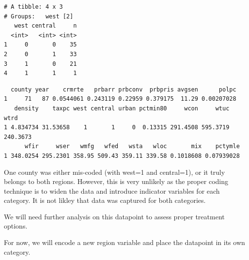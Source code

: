 \documentclass[]{article}
\newenvironment{Shaded}{}{}
\newcommand{\DecValTok}[1]{#1}
\newcommand{\KeywordTok}[1]{\textcolor[rgb]{0.00,0.00,1.00}{#1}}
\newcommand{\NormalTok}[1]{#1}
\newcommand{\OperatorTok}[1]{#1}
\newcommand{\StringTok}[1]{\textcolor[rgb]{0.00,0.50,0.50}{#1}}
\begin{document}
\begin{verbatim}
# A tibble: 4 x 3
# Groups:   west [2]
   west central     n
  <int>   <int> <int>
1     0       0    35
2     0       1    33
3     1       0    21
4     1       1     1
\end{verbatim}

\begin{Shaded}
\end{Shaded}

\begin{verbatim}
  county year    crmrte   prbarr prbconv  prbpris avgsen      polpc
1     71   87 0.0544061 0.243119 0.22959 0.379175  11.29 0.00207028
   density    taxpc west central urban pctmin80     wcon     wtuc     wtrd
1 4.834734 31.53658    1       1     0  0.13315 291.4508 595.3719 240.3673
      wfir     wser   wmfg   wfed   wsta   wloc       mix    pctymle
1 348.0254 295.2301 358.95 509.43 359.11 339.58 0.1018608 0.07939028
\end{verbatim}

One county was either mis-coded (with west=1 and central=1), or it truly
belongs to both regions. However, this is very unlikely as the proper
coding technique is to widen the data and introduce indicator variables
for each category. It is not likley that data was captured for both
categories.

We will need further analysis on this datapoint to assess proper
treatment options.

For now, we will encode a new region variable and place the datapoint in
its own category.
\end{document}
